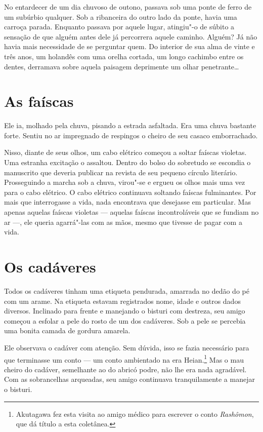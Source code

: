 No entardecer de um dia chuvoso de outono, passava sob uma ponte de
ferro de um subúrbio qualquer. Sob a ribanceira do outro lado da ponte,
havia uma carroça parada. Enquanto passava por aquele lugar, atingiu"-o
de súbito a sensação de que alguém antes dele já percorrera aquele
caminho. Alguém? Já não havia mais necessidade de se perguntar quem. Do
interior de sua alma de vinte e três anos, um holandês com uma orelha
cortada, um longo cachimbo entre os dentes, derramava sobre aquela
paisagem deprimente um olhar penetrante\ldots{}

\section{As faíscas}

Ele ia, molhado pela chuva, pisando a estrada asfaltada. Era uma chuva
bastante forte. Sentiu no ar impregnado de respingos o cheiro de seu
casaco emborrachado.

Nisso, diante de seus olhos, um cabo elétrico começou a soltar faíscas
violetas. Uma estranha excitação o assaltou. Dentro do bolso do
sobretudo se escondia o manuscrito que deveria publicar na revista de
seu pequeno círculo literário. Prosseguindo a marcha sob a chuva,
virou"-se e ergueu os olhos mais uma vez para o cabo elétrico. O cabo
elétrico continuava soltando faíscas fulminantes. Por mais que
interrogasse a vida, nada encontrava que desejasse em particular. Mas
apenas aquelas faíscas violetas --- aquelas faíscas incontroláveis que se
fundiam no ar ---, ele queria agarrá"-las com as mãos, mesmo que tivesse
de pagar com a vida.

\section{Os cadáveres}

Todos os cadáveres tinham uma etiqueta pendurada, amarrada no dedão do
pé com um arame. Na etiqueta estavam registrados nome, idade e outros
dados diversos. Inclinado para frente e manejando o bisturi com
destreza, seu amigo começou a esfolar a pele do rosto de um dos
cadáveres. Sob a pele se percebia uma bonita camada de gordura amarela.

Ele observava o cadáver com atenção. Sem dúvida, isso se fazia
necessário para que terminasse um conto --- um conto ambientado na era
Heian.\footnote{ Akutagawa fez esta visita ao amigo médico para escrever
o conto \textit{Rashômon}, que dá título a esta coletânea.} Mas o mau cheiro
do cadáver, semelhante ao do abricó podre, não lhe era nada agradável.
Com as sobrancelhas arqueadas, seu amigo continuava tranquilamente a
manejar o bisturi.

